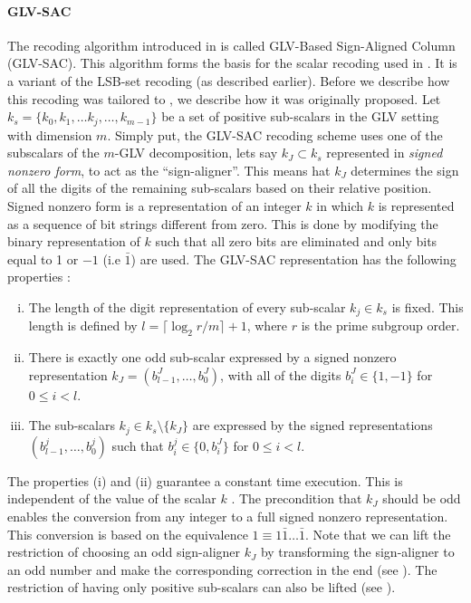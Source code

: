 \paragraph{GLV-SAC}
The recoding algorithm introduced in \cite{faz2015efficient} is called GLV-Based Sign-Aligned Column (GLV-SAC).
This algorithm forms the basis for the scalar recoding used in {\fourq}.
It is a variant of the LSB-set recoding (as described earlier).
Before we describe how this recoding was tailored to {\fourq}, we describe how it was originally proposed.
Let $k_s = \{k_0, k_1, \ldots k_j, \ldots , k_{m - 1} \}$ be a set of positive sub-scalars in the GLV setting with dimension $m$.
Simply put, the GLV-SAC recoding scheme uses one of the subscalars of the $m$-GLV decomposition, lets say $k_J \subset k_s$ represented in \textit{signed nonzero form}, to act as the ``sign-aligner''.
This means hat $k_J$ determines the sign of all the digits of the remaining sub-scalars based on their relative position.
Signed nonzero form is a representation of an integer $k$ in which $k$ is represented as a sequence of bit strings different from zero.
This is done by modifying the binary representation of $k$ such that all zero bits are eliminated and only bits equal to 1 or $-1$ (i.e $\bar{1}$) are used.
The GLV-SAC representation has the following properties \cite{faz2015efficient}:
%
\begin{enumerate}[(i)]
	\item The length of the digit representation of every sub-scalar $k_j \in k_s$ is fixed. This length is defined by $l = \lceil \log_2 r/m \rceil + 1$, where $r$ is the prime subgroup order.
	
	\item There is exactly one odd sub-scalar expressed by a signed nonzero representation $k_J = ( b_{l - 1}^J, \ldots, b_0^J )$, with all of the digits $b_i^J \in \{1, -1 \}$ for $0 \le i < l$.
	
	\item The sub-scalars $k_j \in k_s \setminus \{k_J\}$ are expressed by the signed representations $(b_{l - 1}^j, \ldots, b_0^j)$ such that $b_i^j \in \{0, b_i^J\}$ for $0 \le i < l$.
\end{enumerate}
%
The properties (i) and (ii) guarantee a constant time execution.
This is independent of the value of the scalar $k$ \cite{faz2015efficient}.
The precondition that $k_J$ should be odd enables the conversion from any integer to a full signed nonzero representation.
This conversion is based on the equivalence $1 \equiv 1 \bar{1} \ldots \bar{1}$.
Note that we can lift the restriction of choosing an odd sign-aligner $k_J$ by transforming the sign-aligner to an odd number and make the corresponding correction in the end (see \cite[§3.1]{faz2015efficient}).
The restriction of having only positive sub-scalars can also be lifted (see \cite[§3.3]{faz2015efficient}).

